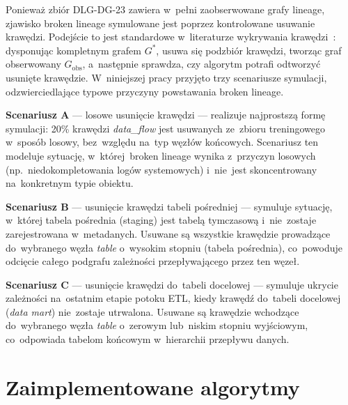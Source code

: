 Ponieważ zbiór DLG-DG-23 zawiera w~pełni zaobserwowane grafy lineage,
zjawisko broken lineage symulowane jest poprzez kontrolowane usuwanie
krawędzi. Podejście to jest standardowe w~literaturze wykrywania
krawędzi~\cite{LibenNowell2007}: dysponując kompletnym grafem
$G^{*}$, usuwa się podzbiór krawędzi, tworząc graf obserwowany
$G_{\mathrm{obs}}$, a~następnie sprawdza, czy algorytm potrafi
odtworzyć usunięte krawędzie. W~niniejszej pracy przyjęto trzy
scenariusze symulacji, odzwierciedlające typowe przyczyny powstawania
broken lineage.

\textbf{Scenariusz A} — losowe usunięcie krawędzi — realizuje
najprostszą formę symulacji: 20\% krawędzi \emph{data\_flow} jest
usuwanych ze~zbioru treningowego w~sposób losowy, bez~względu na~typ
węzłów końcowych. Scenariusz ten modeluje sytuację, w~której~broken
lineage wynika z~przyczyn losowych (np.~niedokompletowania logów
systemowych) i~nie~jest skoncentrowany na~konkretnym typie obiektu.

\textbf{Scenariusz B} — usunięcie krawędzi tabeli pośredniej —
symuluje sytuację, w~której tabela pośrednia (staging) jest tabelą
tymczasową i~nie~zostaje zarejestrowana w~metadanych. Usuwane są
wszystkie krawędzie prowadzące do~wybranego węzła \emph{table}
o~wysokim stopniu (tabela pośrednia), co~powoduje odcięcie
całego podgrafu zależności przepływającego przez ten węzeł.

\textbf{Scenariusz C} — usunięcie krawędzi do~tabeli docelowej —
symuluje ukrycie zależności na~ostatnim etapie potoku ETL, kiedy
krawędź do~tabeli docelowej (\emph{data mart}) nie~zostaje utrwalona.
Usuwane są krawędzie wchodzące do~wybranego węzła \emph{table}
o~zerowym lub~niskim stopniu wyjściowym, co~odpowiada tabelom
końcowym w~hierarchii przepływu danych.



\section{Zaimplementowane algorytmy}
\label{sec:algorytmy}

